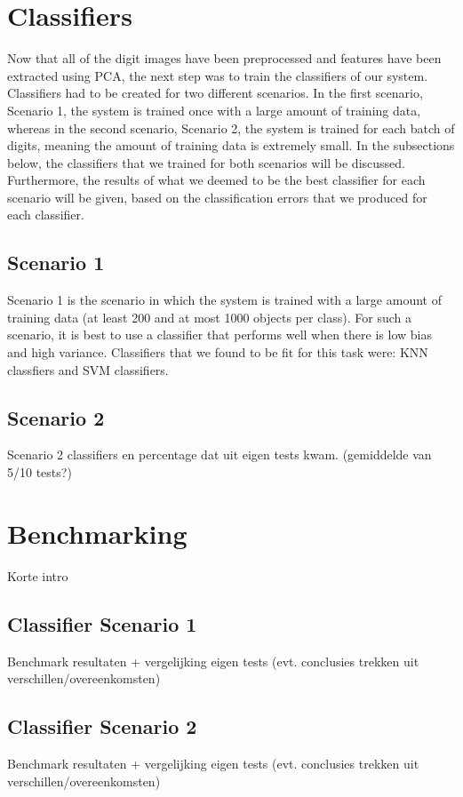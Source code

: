 \documentclass[11pt,twoside,a4paper]{article}
\begin{document}
\section{Classifiers}
Now that all of the digit images have been preprocessed and features have been extracted using PCA, the next step was to train the classifiers of our system. Classifiers had to be created for two different scenarios. In the first scenario, Scenario 1, the system is trained once with a large amount of training data, whereas in the second scenario, Scenario 2, the system is trained for each batch of digits, meaning the amount of training data is extremely small.\newline\newline
In the subsections below, the classifiers that we trained for both scenarios will be discussed. Furthermore, the results of what we deemed to be the best classifier for each scenario will be given, based on the classification errors that we produced for each classifier.
\subsection{Scenario 1}
Scenario 1 is the scenario in which the system is trained with a large amount of training data (at least 200 and at most 1000 objects per class). For such a scenario, it is best to use a classifier that performs well when there is low bias and high variance. Classifiers that we found to be fit for this task were: KNN classfiers and SVM classifiers.
\subsection{Scenario 2}
Scenario 2 classifiers en percentage dat uit eigen tests kwam. (gemiddelde van 5/10 tests?)



\section{Benchmarking}
Korte intro

\subsection{Classifier Scenario 1}
Benchmark resultaten + vergelijking eigen tests (evt. conclusies trekken uit verschillen/overeenkomsten)

\subsection{Classifier Scenario 2}
Benchmark resultaten + vergelijking eigen tests (evt. conclusies trekken uit verschillen/overeenkomsten)
\end{document}
